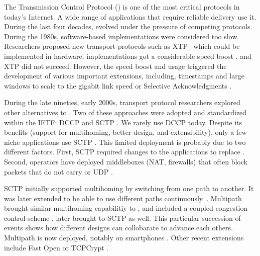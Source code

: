 The Transmission Control Protocol (\tcp) \cite{rfc793}
is one of the most critical protocols in today's Internet.
A wide range of applications that require reliable delivery use it. During the
last four decades, \tcp
evolved under the pressure of competing protocols. During the 1980s,
software-based \tcp implementations were considered too slow. Researchers
proposed new transport protocols such as XTP~\cite{sanders1990xpress}
which could be implemented in hardware. \tcp implementations got
a considerable speed boost \cite{clark1989analysis}, and XTP did not succeed.  However,
the \tcp speed boost and usage triggered the development of various important \tcp
extensions, including,
timestamps and large windows \cite{rfc1323} to scale to the gigabit link speed
or Selective Acknowledgments \cite{rfc2018}.

During the late nineties, early 2000s, transport protocol researchers
explored other alternatives to \tcp. Two of these approaches were adopted
and standardized within the IETF: DCCP \cite{kohler2006designing} and
SCTP \cite{rfc4960}. We rarely use DCCP today. Despite its benefits
(support for multihoming, better design, and extensibility), only a few niche
applications use SCTP \cite{budzisz2012taxonomy}.
This limited deployment is probably due
to two different factors. First, SCTP required changes to the applications to
replace \tcp. Second, operators have deployed middleboxes (NAT, firewalls) that
often block packets that do not carry \tcp or UDP \cite{honda2011still}.

SCTP initially supported multihoming by switching from one path to another. It
was later extended to be able to use different paths
continuously~\cite{iyengar2006concurrent}.  Multipath \tcp \cite{rfc6824,raiciu2012hard}
brought similar multihoming capabilitiy to \tcp, and included a coupled congestion control
scheme \cite{wischik2011design}, later brought to SCTP as well. This particular
succession of events shows how
different designs can collobarate to advance each others.  Multipath \tcp is now deployed, notably on
smartphones \cite{bonaventure2016multipath}. Other recent \tcp extensions include
\tcp Fast Open \cite{rfc7413} or TCPCrypt \cite{rfc8548}.


